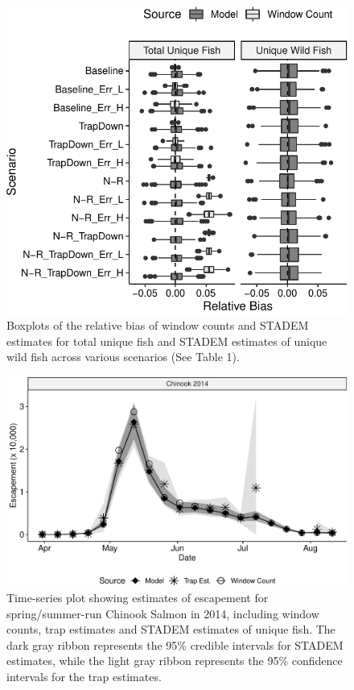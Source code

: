 \documentclass[
  12pt,
]{article}
\begin{document}
\newpage

\begin{figure}
\centering
\includegraphics{../figures/rel-bias-lgd-1.pdf}
\caption{\label{fig:rel-bias-lgd}Boxplots of the relative bias of window counts and STADEM estimates for total unique fish and STADEM estimates of unique wild fish across various scenarios (See Table 1).}
\end{figure}

\newpage

\begin{figure}
\centering
\includegraphics{../figures/jags-fit-fig-1.pdf}
\caption{\label{fig:jags-fit-fig}Time-series plot showing estimates of escapement for spring/summer-run Chinook Salmon in 2014, including window counts, trap estimates and STADEM estimates of unique fish. The dark gray ribbon represents the 95\% credible intervals for STADEM estimates, while the light gray ribbon represents the 95\% confidence intervals for the trap estimates.}
\end{figure}
\end{document}
